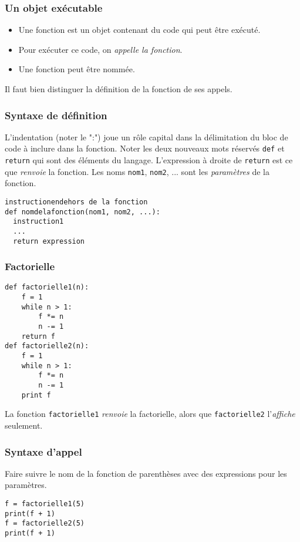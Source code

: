 


\begin{frame}
  \frametitle{Un objet exécutable}
\begin{itemize}
  \item Une fonction est un objet contenant du code qui peut être exécuté.
  \item Pour exécuter ce code, on \emph{appelle la fonction}.
  \item Une fonction peut être nommée.
\end{itemize}
Il faut bien distinguer la définition de la fonction de ses appels.
\end{frame}


\begin{frame}[fragile]
  \frametitle{Syntaxe de définition}
L'indentation (noter le ":") joue un rôle capital dans la délimitation du bloc de code à inclure dans la fonction.\newline
Noter les deux nouveaux mots réservés \texttt{def} et \texttt{return} qui sont des éléments du langage.\newline
L'expression à droite de \texttt{return} est ce que \emph{renvoie} la fonction.\newline
Les noms \texttt{nom1}, \texttt{nom2}, ... sont les \emph{paramètres} de la fonction.
\begin{verbatim}
instructionendehors de la fonction
def nomdelafonction(nom1, nom2, ...):
  instruction1
  ...
  return expression
\end{verbatim}
\end{frame}

\begin{frame}[fragile]
  \frametitle{Factorielle}
\begin{verbatim}
def factorielle1(n):
    f = 1
    while n > 1:
        f *= n
        n -= 1
    return f
def factorielle2(n):
    f = 1
    while n > 1:
        f *= n
        n -= 1
    print f
\end{verbatim}
La fonction \texttt{factorielle1} \emph{renvoie} la factorielle, alors que \texttt{factorielle2} l'\emph{affiche} seulement.
\end{frame}

\begin{frame}[fragile]
  \frametitle{Syntaxe d'appel}
Faire suivre le nom de la fonction de parenthèses avec des expressions pour les paramètres.
\begin{verbatim}
f = factorielle1(5)
print(f + 1)
f = factorielle2(5)
print(f + 1)
\end{verbatim}
\end{frame}

